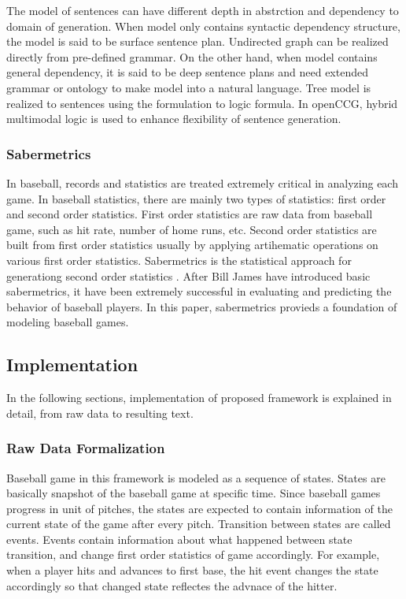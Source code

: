 \documentclass[11pt,letterpaper]{article}
\begin{document}
The model of sentences can have different depth in abstrction and dependency to domain of generation. When model only contains syntactic dependency structure, the model is said to be surface sentence plan. Undirected graph can be realized directly from pre-defined grammar. On the other hand, when model contains general dependency, it is said to be deep sentence plans and need extended grammar or ontology to make model into a natural language. Tree model is realized to sentences using the formulation to logic formula. In openCCG, hybrid multimodal logic is used to enhance flexibility of sentence generation. 


\subsubsection{Sabermetrics}

In baseball, records and statistics are treated extremely critical in analyzing each game. In baseball statistics, there are mainly two types of statistics: first order and second order statistics. First order statistics are raw data from baseball game, such as hit rate, number of home runs, etc. Second order statistics are built from first order statistics usually by applying artihematic operations on various first order statistics. Sabermetrics is the statistical approach for generationg second order statistics \cite{billjames}. After Bill James have introduced basic sabermetrics, it have been extremely successful in evaluating and predicting the behavior of baseball players. In this paper, sabermetrics provieds a foundation of modeling baseball games. 


\subsection{Implementation}

In the following sections, implementation of proposed framework is explained in detail, from raw data to resulting text. 

\subsubsection{Raw Data Formalization}

Baseball game in this framework is modeled as a sequence of states. States are basically snapshot of the baseball game at specific time. Since baseball games progress in unit of pitches, the states are expected to contain information of the current state of the game after every pitch. Transition between states are called events. Events contain information about what happened between state transition, and change first order statistics of game accordingly. For example, when a player hits and advances to first base, the hit event changes the state accordingly so that changed state reflectes the advnace of the hitter. 
\end{document}
